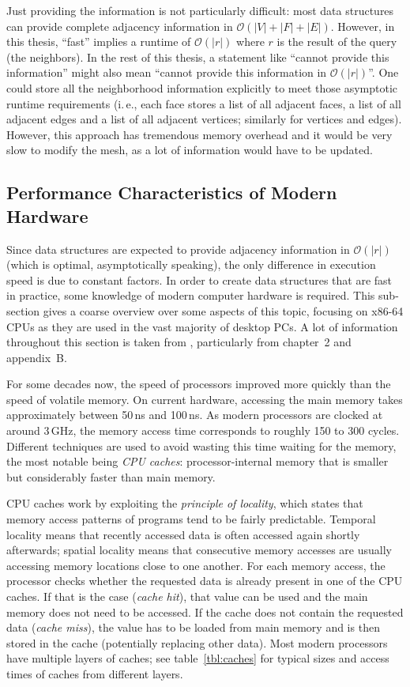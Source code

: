 Just providing the information is not particularly difficult:
most data structures can provide complete adjacency information in $\mathcal O(|V| + |F| + |E|)$.
However, in this thesis, \enquote{fast} implies a runtime of $\mathcal O(|r|)$ where $r$ is the result of the query (the neighbors). In the rest of this thesis, a statement like \enquote{cannot provide this information} might also mean \enquote{cannot provide this information in $\mathcal O(|r|)$}.
One could store all the neighborhood information explicitly to meet those asymptotic runtime requirements (i.\,e., each face stores a list of all adjacent faces, a list of all adjacent edges and a list of all adjacent vertices; similarly for vertices and edges).
However, this approach has tremendous memory overhead and it would be very slow to modify the mesh, as a lot of information would have to be updated.

\subsection{Performance Characteristics of Modern Hardware}

Since data structures are expected to provide adjacency information in $\mathcal O(|r|)$ (which is optimal, asymptotically speaking), the only difference in execution speed is due to constant factors.
In order to create data structures that are fast in practice, some knowledge of modern computer hardware is required.
This sub-section gives a coarse overview over some aspects of this topic, focusing on x86-64 CPUs as they are used in the vast majority of desktop PCs.
A lot of information throughout this section is taken from \cite{hennessy2017computer}, particularly from chapter~2 and appendix~B.

For some decades now, the speed of processors improved more quickly than the speed of volatile memory.
On current hardware, accessing the main memory takes approximately between 50\,ns and 100\,ns.
As modern processors are clocked at around 3\,GHz, the memory access time corresponds to roughly 150 to 300 cycles.
Different techniques are used to avoid wasting this time waiting for the memory, the most notable being \emph{CPU caches}: processor-internal memory that is smaller but considerably faster than main memory.

CPU caches work by exploiting the \emph{principle of locality}, which states that memory access patterns of programs tend to be fairly predictable.
Temporal locality means that recently accessed data is often accessed again shortly afterwards;
spatial locality means that consecutive memory accesses are usually accessing memory locations close to one another.
For each memory access, the processor checks whether the requested data is already present in one of the CPU caches.
If that is the case (\emph{cache hit}), that value can be used and the main memory does not need to be accessed.
If the cache does not contain the requested data (\emph{cache miss}), the value has to be loaded from main memory and is then stored in the cache (potentially replacing other data).
Most modern processors have multiple layers of caches; see table~\ref{tbl:caches} for typical sizes and access times of caches from different layers.

